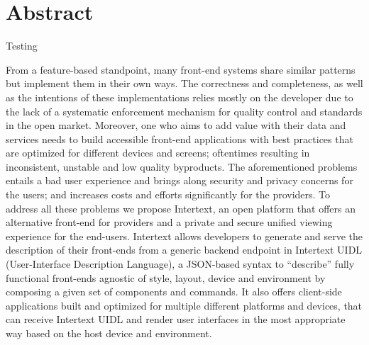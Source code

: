 \section*{Abstract}

Testing

From a feature-based standpoint, many front-end systems share similar patterns but implement them in their own ways. The correctness and completeness, as well as the intentions of these implementations relies mostly on the developer due to the lack of a systematic enforcement mechanism for quality control and standards in the open market. Moreover, one who aims to add value with their data and services needs to build accessible front-end applications with best practices that are optimized for different devices and screens; oftentimes resulting in inconsistent, unstable and low quality byproducts. The aforementioned problems entails a bad user experience and brings along security and privacy concerns for the users; and increases costs and efforts significantly for the providers. To address all these problems we propose Intertext, an open platform that offers an alternative front-end for providers and a private and secure unified viewing experience for the end-users. Intertext allows developers to generate and serve the description of their front-ends from a generic backend endpoint in Intertext UIDL (User-Interface Description Language), a JSON-based syntax to “describe” fully functional front-ends agnostic of style, layout, device and environment by composing a given set of components and commands. It also offers client-side applications built and optimized for multiple different platforms and devices, that can receive Intertext UIDL and render user interfaces in the most appropriate way based on the host device and environment.